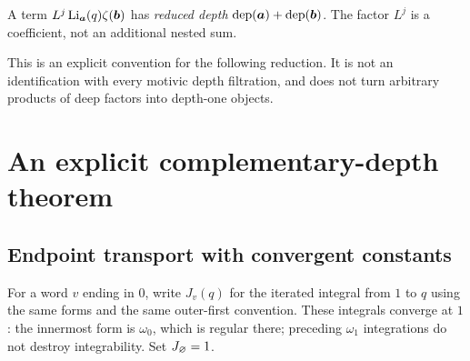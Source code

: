 \begin{definition}
A term $L^j\operatorname{Li}_{\boldsymbol a}(q)\zeta(\boldsymbol b)$ has
\emph{reduced depth} $\operatorname{dep}(\boldsymbol a)+\operatorname{dep}(\boldsymbol b)$.
The factor $L^j$ is a coefficient, not an additional nested sum.
\end{definition}
This is an explicit convention for the following reduction. It is not
an identification with every motivic depth filtration, and does not
turn arbitrary products of deep factors into depth-one objects.

\section{An explicit complementary-depth theorem}

\subsection{Endpoint transport with convergent constants}
For a word $v$ ending in $0$, write $J_v(q)$ for the iterated integral
from $1$ to $q$ using the same forms and the same outer-first convention.
These integrals converge at $1$: the innermost form is $\omega_0$, which
is regular there; preceding $\omega_1$ integrations do not destroy
integrability. Set $J_\varnothing=1$.


